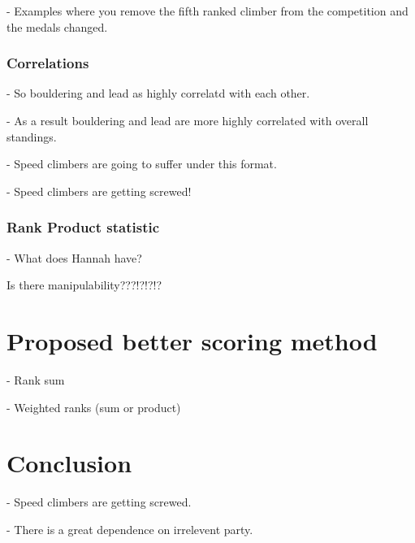 \documentclass{article}\usepackage[]{graphicx}\usepackage[]{color}
\begin{document}
 - Examples where you remove the fifth ranked climber from the competition and the medals changed. 
 
 \subsubsection{Correlations}
 
 - So bouldering and lead as highly correlatd with each other. 
 
 - As a result bouldering and lead are more highly correlated with overall standings.  
 
 - Speed climbers are going to suffer under this format.  
 
 - Speed climbers are getting screwed!
 
 \subsubsection{Rank Product statistic}
 
- What does Hannah have?
 
Is there manipulability???!?!?!?

% 

\section{Proposed better scoring method}
 - Rank sum
 
 - Weighted ranks (sum or product)

\section{Conclusion}

- Speed climbers are getting screwed.  

- There is a great dependence on irrelevent party. 




\end{document}
